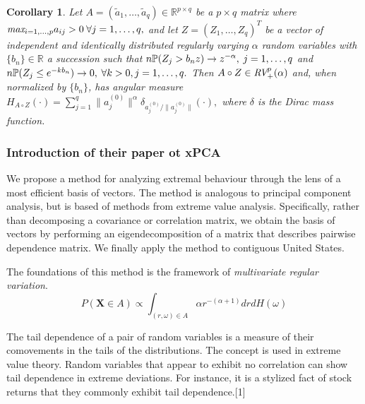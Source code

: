 \documentclass[11pt, oneside]{book}
\theoremstyle{plain}
\newtheorem{cor}{Corollary}[thm]
\theoremstyle{remark}
\begin{document}
\begin{cor}
    Let $A=(\tilde{a}_1,\dots,\tilde{a}_q)\in\mathbb{R}^{p\times q}$ be a
    $p\times q$ matrix where $\emph{max}_{i=1,\dots,p}a_{ij}>0\hspace{.25em}
    \forall j=1,\dots,q,$ and let $Z=(Z_1,\dots,Z_q)^T$ be a vector of
    independent and identically distributed regularly varying $\alpha$ random
    variables with $\{b_n\}\in\mathbb{R}$ a succession such that
    $n\mathbb{P}(Z_j>b_nz)\to z^{-\alpha},\hspace{.25em}j=1,\dots,q$ and
    $n\mathbb{P}(Z_j\leq e^{-kb_n})\to 0,\hspace{.25em}\forall k>0,j=1,\dots,q.$
    Then $A\circ Z\in\emph{RV}^p_+(\alpha)$ and, when normalized by $\{b_n\}$,
    has angular measure $H_{A\circ Z}(\cdot) = \sum_{j=1}^q\lVert
    a_j^{(0)}\lVert^\alpha\delta_{a_j^{(0)}/\lVert a_j^{(0)}\lVert}(\cdot),$
    where $\delta$ is the Dirac mass function.
\end{cor}








\subsubsection*{Introduction of their paper ot xPCA}
We propose a method for analyzing extremal behaviour through the lens of a most
efficient basis of vectors. The method is analogous to principal component
analysis, but is based of methods from extreme value analysis. Specifically,
rather than decomposing a covariance or correlation matrix, we obtain the basis
of vectors by performing an eigendecomposition of a matrix that describes
pairwise dependence matrix. We finally apply the method to contiguous United
States.

The foundations of this method is the framework of
\emph{multivariate regular
variation}.
$$P(\mathbf{X}\in A) \propto\int_{(r,\omega)\in A}\alpha
r^{-(\alpha+1)}drdH(\omega)$$

The tail dependence of a pair of random variables is a measure of their
comovements in the tails of the distributions. The concept is used in extreme
value theory. Random variables that appear to exhibit no correlation can show
tail dependence in extreme deviations. For instance, it is a stylized fact of
stock returns that they commonly exhibit tail dependence.[1]
\end{document}
